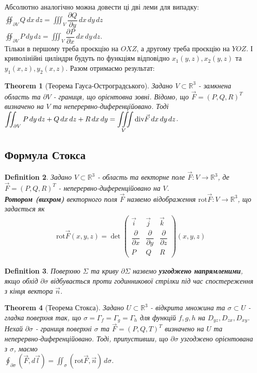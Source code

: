 \documentclass[a4paper, 10pt]{article}
\def\departial#1#2{\dfrac{\partial {#1}}{\partial {#2}}}
\theoremstyle{theoremdd}
\newtheorem{theorem}{Theorem}[subsection]
\theoremstyle{theoremdd}
\newtheorem{definition}[theorem]{Definition}
\theoremstyle{theoremdd}
\theoremstyle{theoremdd}
\theoremstyle{theoremdd}
\theoremstyle{theoremdd}
\theoremstyle{theoremdd}
\theoremstyle{theoremdd}
\theoremstyle{theoremdd}
\theoremstyle{theoremdd}
\theoremstyle{theoremdd}
\theoremstyle{theoremdd}
\theoremstyle{theoremdd}
\theoremstyle{theoremdd}
\theoremstyle{theoremdd}
\begin{document}
Абсолютно аналогічно можна довести ці дві леми для випадку:\\
$\displaystyle\oiint_{\partial V}Q\,dx\,dz = \iiint_V \departial{Q}{y}\,dx\,dy\,dz$\\
$\displaystyle\oiint_{\partial V}P\,dy\,dz = \iiint_V \departial{P}{x}\,dx\,dy\,dz$.\\
Тільки в першому треба проєкцію на $OXZ$, а другому треба проєкцію на $YOZ$. І криволінійні циліндри будуть по функціям відповідно $x_1(y,z),x_2(y,z)$ та $y_1(x,z), y_2(x,z)$. Разом отримаємо результат:

\begin{theorem}[Теорема Гауса-Остроградського]
Задано $V \subset \mathbb{R}^3$ - замкнена область та $\partial V$ - границя, що орієнтовна зовні. Відомо, що $\vec{F} = (P,Q,R)^T$ визначено на $V$ та неперервно-диференційовано. Тоді\\
$\displaystyle\iint_{\partial V} P\,dy\,dz + Q\,dx\,dz + R\,dx\,dy = \iiint\displaylimits_V \text{div} \vec{F}\,dx\,dy\,dz$. 
\end{theorem}

\subsection{Формула Стокса}
\begin{definition}
Задано $V \subset \mathbb{R}^3$ - область та векторне поле $\vec{F}: V \to \mathbb{R}^3$, де $\vec{F} = (P,Q,R)^T$ - неперервно-диференційовано на $V$.\\
\textbf{Ротором (вихром)} векторного поля $\vec{F}$ назвемо відображення $\text{rot}\vec{F}: V \to \mathbb{R}^3$, що задається як
\begin{align*}
\text{rot} \vec{F}(x,y,z) = \det \begin{pmatrix}
\vec{i} & \vec{j} & \vec{k} \\
\departial{}{x} & \departial{}{y} & \departial{}{z} \\
P & Q & R
\end{pmatrix} (x,y,z)
\end{align*}
\end{definition}

\begin{definition}
Поверхню $\Sigma$ та криву $\partial \Sigma$ назвемо \textbf{узгоджено напрямленими}, якщо обхід $\partial \sigma$ відбувається проти годинникової стрілки під час спостереження з кінця вектора $\vec{n}$.
\end{definition}

\begin{theorem}[Теорема Стокса]
Задано $U \subset \mathbb{R}^3$ - відкрита множина та $\sigma \subset U$ - гладка поверхня так, що $\sigma = \Gamma_f = \Gamma_g = \Gamma_h$ для функцій $f,g,h$ на $D_{yz},D_{zx},D_{xy}$.\\
Нехай $\partial \sigma$ - границя поверхні $\sigma$ та $\vec{F} = (P,Q,T)^T$ визначено на $U$ та неперервно-диференційовано. Тоді, припустивши, що $\partial \sigma$ узгоджено орієнтована з $\sigma$, маємо\\
$\displaystyle\oint_{\partial \sigma} (\vec{F}, d \vec{l}) = \iint_\sigma (\text{rot} \vec{F}, \vec{n})\,d\sigma$.
\end{theorem}
\end{document}
